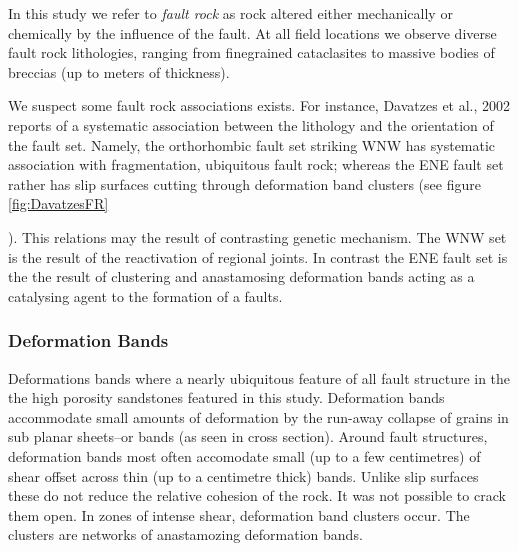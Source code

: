 \documentclass[12pt,a4paper]{article}
\begin{document}
{%
    

	


In this study we refer to \textit{fault rock} as rock altered either mechanically or chemically by the influence of the fault. At all field locations we observe diverse fault rock lithologies, ranging from finegrained cataclasites to massive  bodies of breccias (up to meters of thickness). 

We suspect some fault rock associations exists. For instance, Davatzes et al., 2002 reports of a systematic association between the lithology and the orientation of the fault set. Namely, the orthorhombic fault set striking WNW has systematic association with fragmentation, ubiquitous fault rock; whereas the ENE fault set rather has slip surfaces cutting through deformation band clusters (see figure \ref{fig:DavatzesFR}}). This relations may the result of contrasting genetic mechanism. The WNW set is the result of the reactivation of regional joints. In contrast the ENE fault set is the the result of clustering and anastamosing deformation bands acting as a catalysing agent to the formation of a faults.

\subsubsection{Deformation Bands}

Deformations bands where a nearly ubiquitous feature of all fault structure in the the high porosity sandstones featured in this study. Deformation bands accommodate small amounts of deformation by the run-away collapse of grains in sub planar sheets--or bands (as seen in cross section). Around fault structures, deformation bands most often accomodate small (up to a few centimetres) of shear offset across thin (up to a centimetre thick) bands. Unlike slip surfaces these do not reduce the relative cohesion of the rock. It was not possible to crack them open. In zones of intense shear, deformation band clusters occur. The clusters are networks of anastamozing deformation bands.
\end{document}
